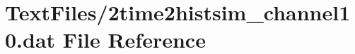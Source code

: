\hypertarget{2time2histsim__channel10_8dat}{}\section{Text\+Files/2time2histsim\+\_\+channel10.dat File Reference}
\label{2time2histsim__channel10_8dat}
